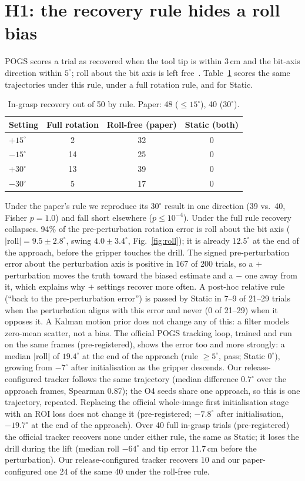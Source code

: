 \documentclass[conference]{IEEEtran}
\begin{document}
\section{H1: the recovery rule hides a roll bias}
POGS scores a trial as recovered when the tool tip is within 3\,cm and the bit-axis direction within $5^\circ$; roll
about the bit axis is left free~\cite{yu2025pogs}. Table~\ref{tab:rules} scores the same trajectories under this rule,
under a full rotation rule, and for Static.
\begin{table}[t]\centering\caption{In-grasp recovery out of 50 by rule. Paper: 48 ($\le15^\circ$), 40 ($30^\circ$).}\label{tab:rules}
\begin{tabular}{lccc}\toprule
Setting & Full rotation & Roll-free (paper) & Static (both)\\\midrule
$+15^\circ$ & 2 & 32 & 0\\ $-15^\circ$ & 14 & 25 & 0\\ $+30^\circ$ & 13 & 39 & 0\\ $-30^\circ$ & 5 & 17 & 0\\\bottomrule
\end{tabular}\end{table}
Under the paper's rule we reproduce its $30^\circ$ result in one direction (39 vs.\ 40, Fisher $p=1.0$) and fall short
elsewhere ($p\le10^{-4}$). Under the full rule recovery collapses. 94\% of the pre-perturbation rotation error is roll
about the bit axis ($|\text{roll}|=9.5\pm2.8^\circ$, swing $4.0\pm3.4^\circ$, Fig.~\ref{fig:roll}); it is already
$12.5^\circ$ at the end of the approach, before the gripper touches the drill. The signed pre-perturbation error
about the perturbation axis is positive in 167 of 200 trials, so a $+$ perturbation moves the truth toward the biased
estimate and a $-$ one away from it, which explains why $+$ settings recover more often. A post-hoc relative rule
(``back to the pre-perturbation error'') is passed by Static in 7--9 of 21--29 trials when the perturbation aligns
with this error and never (0 of 21--29) when it opposes it. A Kalman motion prior does not change any of this: a filter models zero-mean scatter, not a bias. The official
POGS tracking loop, trained and run on the same frames (pre-registered), shows the error too and more strongly: a
median $|\text{roll}|$ of $19.4^\circ$ at the end of the approach (rule $\ge5^\circ$, pass; Static $0^\circ$), growing
from $-7^\circ$ after initialisation as the gripper descends. Our release-configured tracker follows the same
trajectory (median difference $0.7^\circ$ over the approach frames, Spearman 0.87); the O4 seeds share one approach,
so this is one trajectory, repeated. Replacing the official whole-image first initialisation stage with an ROI loss
does not change it (pre-registered; $-7.8^\circ$ after initialisation, $-19.7^\circ$ at the end of the approach).
Over 40 full in-grasp trials (pre-registered) the official tracker recovers none under either rule, the same as
Static; it loses the drill during the lift (median roll $-64^\circ$ and tip error 11.7\,cm before the perturbation).
Our release-configured tracker recovers 10 and our paper-configured one 24 of the same 40 under the roll-free rule.
\end{document}
